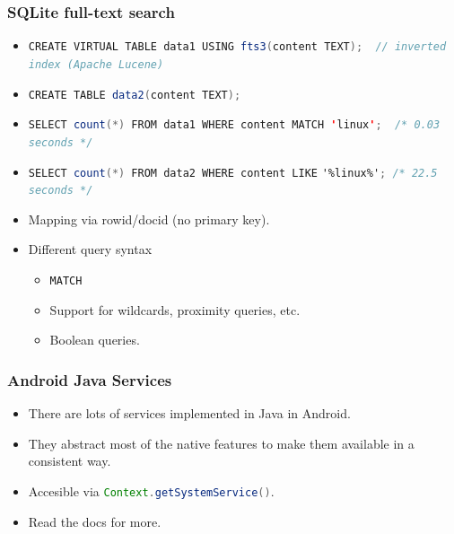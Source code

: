 \documentclass[10pt,xcolor=pdflatex]{beamer}
\newcommand{\inlinejava}{\lstinline[language={Java},basicstyle=\ttfamily,keepspaces]}
\begin{document}
\begin{frame}[fragile]\frametitle{SQLite full-text search}
\begin{itemize}
	\item {\color{black}\inlinejava{CREATE VIRTUAL TABLE data1 USING fts3(content TEXT);  // inverted index (Apache Lucene)}} 
	\item {\color{black}\inlinejava{CREATE TABLE data2(content TEXT);}} 
    \vspace*{0.5cm}
	\item {\color{black}\inlinejava{SELECT count(*) FROM data1 WHERE content MATCH 'linux';  /* 0.03 seconds */}} 
	\item {\color{black}\inlinejava{SELECT count(*) FROM data2 WHERE content LIKE}} \color{red}\verb|'%linux%'|{\color{black}\inlinejava{; /* 22.5 seconds */}}\color{black}
    \vspace*{0.2cm}
    \item Mapping via rowid/docid (no primary key).
	\item Different query syntax
      \begin{itemize}
   		\item \verb;MATCH;
    	\item Support for wildcards, proximity queries, etc.
		\item Boolean queries.
      \end{itemize}
\end{itemize}
\end{frame}


\begin{frame}[fragile]\frametitle{Android Java Services}
\begin{itemize}
	\item There are lots of services implemented in Java in Android.
	\item They abstract most of the native features to make them available in a consistent way.
	\item Accesible via {\color{black}\inlinejava{Context.getSystemService()}}.
	\item Read the docs for more.
\end{itemize}
\end{frame}
\end{document}
